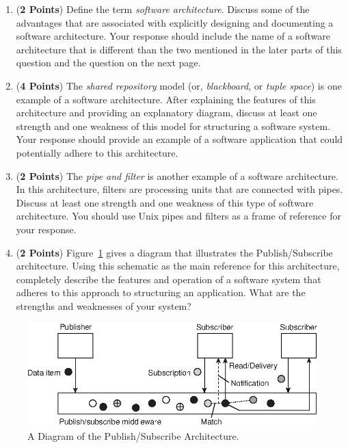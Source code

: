 \documentclass[12pt,epsf,psfig,graphics]{article}
\begin{document}
\begin{enumerate}
\begin{enumerate}

\item ({\bf 2 Points}) Define the term {\em software architecture}.
  Discuss some of the advantages that are associated with explicitly
  designing and documenting a software architecture.  Your response
  should include the name of a software architecture that is different
  than the two mentioned in the later parts of this question and the
  question on the next page.

\item ({\bf 4 Points}) The {\em shared repository} model (or, {\em
  blackboard}, or {\em tuple space}) is one example of a software
  architecture.  After explaining the features of this architecture
  and providing an explanatory diagram, discuss at least one strength
  and one weakness of this model for structuring a software system.
  Your response should provide an example of a software application
  that could potentially adhere to this architecture.

\item ({\bf 2 Points}) The {\em pipe and filter} is another example of
  a software architecture.  In this architecture, filters are
  processing units that are connected with pipes.  Discuss at least
  one strength and one weakness of this type of software architecture.
  You should use Unix pipes and filters as a frame of reference for
  your response.

\item ({\bf 2 Points}) Figure~\ref{fig:ps} gives a diagram that
  illustrates the Publish/Subscribe architecture.  Using this
  schematic as the main reference for this architecture, completely
  describe the features and operation of a software system that
  adheres to this approach to structuring an application.  What are
  the strengths and weaknesses of your system?

\end{enumerate}

\begin{figure}[h]
\begin{center}
\includegraphics{13-02.eps}
\end{center}
\vspace*{-.2in}
\caption{A Diagram of the Publish/Subscribe Architecture.}
\vspace*{-.15in}
\label{fig:ps}
\end{figure}


\end{enumerate}
\end{document}
